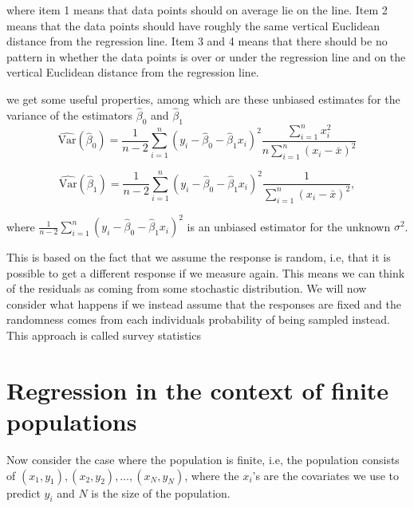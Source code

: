 \documentclass{article}
\begin{document}


where item 1 means that data points should on average lie on the line.
Item 2 means that the data points should have roughly the same vertical
Euclidean distance from the regression line.
Item 3 and 4 means that there should be no pattern in whether the data points is over
or under the regression line and on the vertical Euclidean distance from the
regression line.

we get some useful properties, among which are these unbiased estimates for the
variance of the estimators \(\hat{\beta}_0\) and \(\hat{\beta}_1\)
\begin{equation*}
 \widehat{\mathrm{Var}} \left( \hat{\beta}_0 \right) = \frac{1}{n - 2} \sum_{i = 1}^n\left( y_i - \hat{\beta}_0 -
 \hat{\beta}_1 x_i \right)^2 \frac{\sum_{i = 1}^n x_i^2}{n
   \sum_{i = 1}^n \left( x_i - \bar{x} \right)^2}
\end{equation*}
 

\begin{equation*}
 \widehat{\mathrm{Var}} \left( \hat{\beta}_1 \right) = \frac{1}{n - 2} \sum_{i = 1}^n\left( y_i - \hat{\beta}_0 -
 \hat{\beta}_1 x_i \right)^2\frac{1}{
   \sum_{i = 1}^n \left( x_i - \bar{x} \right)^2},
\end{equation*}

where \(\frac{1}{n - 2} \sum_{i = 1}^n\left( y_i - \hat{\beta}_0 -
 \hat{\beta}_1 x_i \right)^2\) is an
unbiased estimator for the unknown \(\sigma^2\).

This is based on the fact that we assume the response is random, i.e, that
it is possible to get a different response if we measure again. This means we
can think of the residuals as coming from some stochastic distribution. We will
now consider what happens if we instead assume that the responses are fixed and the
randomness comes from each individuals probability of being sampled instead.
This approach is called survey statistics


\section{Regression in the context of finite populations} \label{sec:RegFinPop}
Now consider the case where the population is finite, i.e, the population
consists of \((x_1, y_1),
(x_2, y_2), \dots , (x_N, y_N)\), where the \(x_i\)'s are the covariates we use to
predict \(y_i\) and \(N\) is the size of the population.
\end{document}
